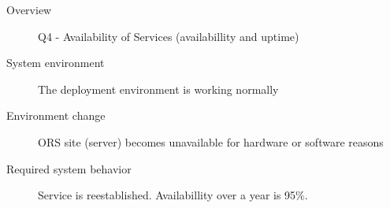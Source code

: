 \begin{description}
    \item[Overview] Q4 - Availability of Services (availabillity and uptime)
    \item[System environment] The deployment environment is working normally
    \item[Environment change] ORS site (server) becomes unavailable for hardware or software reasons
    \item[Required system behavior] Service is reestablished. Availabillity over a year is 95\%.
\end{description}
